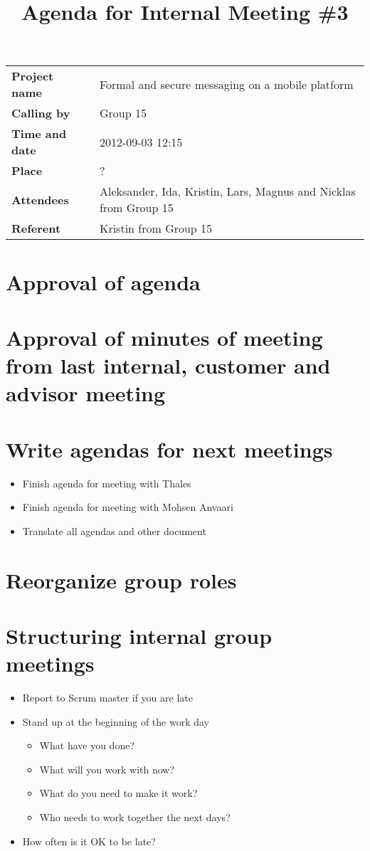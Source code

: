 \documentclass[a4paper,12pt]{article}
\begin{document}
\title{Agenda for Internal Meeting \#3}
\maketitle
\begin{tabular}{>{\bfseries}l l}	
Project name&Formal and secure messaging on a mobile platform\\
Calling by&Group 15\\
Time and date&2012-09-03 12:15\\
Place&?\\
Attendees&Aleksander, Ida, Kristin, Lars, Magnus and Nicklas from Group 15\\
Referent&Kristin from Group 15\\
\end{tabular}

\section{Approval of agenda}
\section{Approval of minutes of meeting from last internal, customer and advisor meeting}
\section{Write agendas for next meetings}
\begin{itemize}
\item
Finish agenda for meeting with Thales
\item
Finish agenda for meeting with Mohsen Anvaari
\item
Translate all agendas and other document
\end{itemize}
\section{Reorganize group roles}
\section{Structuring internal group meetings}
\begin{itemize}
\item
Report to Scrum master if you are late
\item
Stand up at the beginning of the work day
\begin{itemize}
\item
What have you done?
\item
What will you work with now? 
\item
What do you need to make it work?
\item
Who needs to work together the next days?
\end{itemize}
\item
How often is it OK to be late?
\end{itemize}
\end{document}
